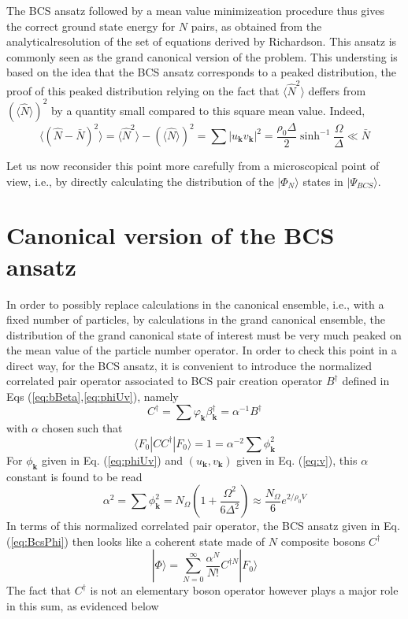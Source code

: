 \documentclass[aps,prb,preprint,groupedaddress,amsmath]{revtex4-1}
\newcommand{\vk}{\ensuremath{\mathbf{k}}}
\newcommand{\dg}{\ensuremath{\dagger}}
\begin{document}
The BCS  ansatz followed by a mean value minimizeation procedure thus  gives the correct ground state energy for $N$ pairs, as obtained from the analyticalresolution of the set of equations derived by Richardson. This ansatz is commonly seen as the grand canonical version of the problem. This understing is based on the idea that the BCS ansatz corresponds to a peaked distribution, the proof of this peaked distribution relying on the fact that $\langle\hat{N}^2\rangle$ deffers from $(\langle\hat{N}\rangle)^2$ by a quantity small compared to this square mean value.  Indeed, 
\begin{equation}
 \langle(\hat{N}-\bar{N})^2\rangle=\langle\hat{N}^2\rangle-(\langle\hat{N}\rangle)^2=\sum{}|u_\vk{}v_\vk|^2=\frac{\rho_0\Delta}2\sinh^{-1}{\frac{\Omega}{\Delta}}\ll\bar{N}
\end{equation}


Let us now reconsider this point more carefully from a microscopical point of view, i.e., by directly calculating the distribution of the $|\Phi_N\rangle$ states in $|\Psi_{BCS}\rangle$.  

\section{Canonical version of the BCS ansatz}
In order to possibly replace calculations in the  canonical ensemble, i.e., with a fixed number of particles, by calculations in the grand canonical ensemble, the  distribution of the grand canonical state of interest  must be very much peaked on the mean value of the particle number operator.  In order to check this point in a direct way, for the BCS ansatz, it is convenient to introduce the normalized correlated pair operator associated to BCS pair creation operator $B^\dg$ defined in Eqs (\ref{eq:bBeta},\ref{eq:phiUv}), namely
\begin{equation}\label{eq:c}
{C}^\dg=\sum{\varphi}_\vk\beta^\dg_\vk=\alpha^{-1}B^\dg
\end{equation} 
with $\alpha$ chosen such that 
\begin{equation}
\langle{}F_0|CC^\dg|F_0\rangle=1=\alpha^{-2}\sum\phi_\vk^2
\end{equation}
For $\phi_\vk$ given in Eq. (\ref{eq:phiUv}) and $(u_\vk,v_\vk)$ given in Eq. (\ref{eq:v}), this $\alpha$ constant is found to be read
\begin{equation}\label{eq:alpha}
\alpha^{2}=\sum\phi_\vk^2=N_\Omega\left(1+\frac{\Omega^2}{6\Delta^2}\right)\approx\frac{N_\Omega}6e^{2/\rho_0V}
\end{equation}
In terms of this normalized correlated pair operator, the BCS ansatz given in Eq. (\ref{eq:BcsPhi}) then looks like a coherent state made of $N$ composite bosons $C^\dg$
\begin{equation}
|\Phi{\rangle}=\sum^\infty_{N=0}\frac{\alpha^N}{N!}C^{\dg{}N}|F_0{\rangle}
\label{eq:BcsPhiNorl}
\end{equation}
The fact that $C^\dg$ is not an elementary boson operator however plays a major role in this sum, as evidenced below
\end{document}
